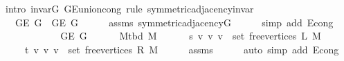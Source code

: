 \begin{isabellebody}
\ {\isacharparenleft}{\kern0pt}intro\ invar{\isacharunderscore}{\kern0pt}G{}\ G{\isachardot}{\kern0pt}E{\isacharunderscore}{\kern0pt}union{\isacharunderscore}{\kern0pt}cong{\isacharparenright}{\kern0pt}\ {\isacharparenleft}{\kern0pt}rule\ symmetric{\isacharunderscore}{\kern0pt}adjacency{\isachardot}{\kern0pt}invar{\isacharparenright}{\kern0pt}\isanewline
\ \ \isamarkupfalse%
\ \isamarkupfalse%
\ {\isachardoublequoteopen}{\isachardot}{\kern0pt}{\isachardot}{\kern0pt}{\isachardot}{\kern0pt}\ {\isacharequal}{\kern0pt}\ G{\isachardot}{\kern0pt}E\ G\ {\isasymunion}\ G{\isachardot}{\kern0pt}E\ {\isacharquery}{\kern0pt}G{}{\isachardoublequoteclose}\isanewline
\ \ \ \ \isamarkupfalse%
\ assms\ symmetric{\isacharunderscore}{\kern0pt}adjacency{\isacharunderscore}{\kern0pt}G{}\isanewline
\ \ \ \ \isamarkupfalse%
\ {\isacharparenleft}{\kern0pt}simp\ add{\isacharcolon}{\kern0pt}\ E{}{\isacharunderscore}{\kern0pt}cong{\isacharparenright}{\kern0pt}\isanewline
\ \ \isamarkupfalse%
\ \isamarkupfalse%
\isanewline
\ \ \ \ {\isachardoublequoteopen}{\isachardot}{\kern0pt}{\isachardot}{\kern0pt}{\isachardot}{\kern0pt}\ {\isacharequal}{\kern0pt}\isanewline
\ \ \ \ \ G{\isachardot}{\kern0pt}E\ G\ {\isasymunion}\isanewline
\ \ \ \ \ M{\isacharunderscore}{\kern0pt}tbd\ M\ {\isasymunion}\isanewline
\ \ \ \ \ {\isacharbraceleft}{\kern0pt}{\isacharbraceleft}{\kern0pt}s{\isacharcomma}{\kern0pt}\ v{\isacharbraceright}{\kern0pt}\ {\isacharbar}{\kern0pt}v{\isachardot}{\kern0pt}\ v\ {\isasymin}\ set\ {\isacharparenleft}{\kern0pt}free{\isacharunderscore}{\kern0pt}vertices\ L\ M{\isacharparenright}{\kern0pt}{\isacharbraceright}{\kern0pt}\ {\isasymunion}\isanewline
\ \ \ \ \ {\isacharbraceleft}{\kern0pt}{\isacharbraceleft}{\kern0pt}t{\isacharcomma}{\kern0pt}\ v{\isacharbraceright}{\kern0pt}\ {\isacharbar}{\kern0pt}v{\isachardot}{\kern0pt}\ v\ {\isasymin}\ set\ {\isacharparenleft}{\kern0pt}free{\isacharunderscore}{\kern0pt}vertices\ R\ M{\isacharparenright}{\kern0pt}{\isacharbraceright}{\kern0pt}{\isachardoublequoteclose}\isanewline
\ \ \ \ \isamarkupfalse%
\ assms{\isacharparenleft}{\kern0pt}{}{\isacharparenright}{\kern0pt}\isanewline
\ \ \ \ \isamarkupfalse%
\ {\isacharparenleft}{\kern0pt}auto\ simp\ add{\isacharcolon}{\kern0pt}\ E{}{\isacharunderscore}{\kern0pt}cong{\isacharparenright}{\kern0pt}\isanewline
\ \ \isamarkupfalse%
\ \isamarkupfalse%
\isanewline

\end{isabellebody}
